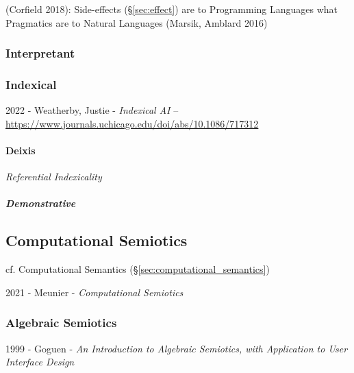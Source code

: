 (Corfield 2018): Side-effects (\S\ref{sec:effect}) are to Programming Languages
what Pragmatics are to Natural Languages (Marsik, Amblard 2016)



\subsubsection{Interpretant}\label{sec:interpretant}

\subsubsection{Indexical}\label{sec:indexical}

2022 - Weatherby, Justie - \emph{Indexical AI} --
\url{https://www.journals.uchicago.edu/doi/abs/10.1086/717312}



\paragraph{Deixis}\label{sec:deixis}\hfill

\emph{Referential Indexicality}



\subparagraph{Demonstrative}\label{sec:demonstrative}\hfill



\subsection{Computational Semiotics}\label{sec:computational_semiotics}

cf. Computational Semantics (\S\ref{sec:computational_semantics})

2021 - Meunier - \emph{Computational Semiotics}



\subsubsection{Algebraic Semiotics}\label{sec:algebraic_semiotics}

1999 - Goguen - \emph{An Introduction to Algebraic Semiotics, with Application
to User Interface Design}
